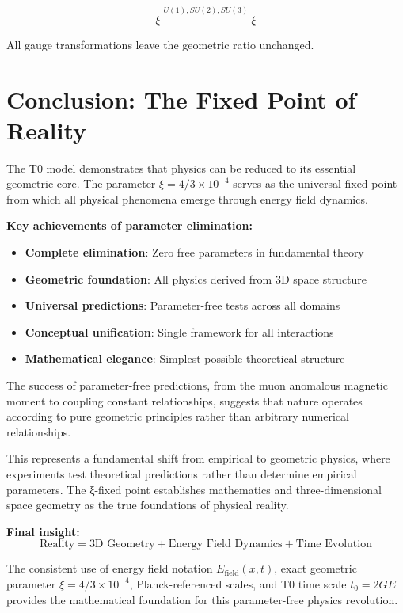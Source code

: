 \documentclass[12pt,a4paper]{report}
\begin{document}
\begin{equation}
	\xi \xrightarrow{U(1), SU(2), SU(3)} \xi
\end{equation}

All gauge transformations leave the geometric ratio unchanged.

\section{Conclusion: The Fixed Point of Reality}
\label{sec:conclusion_fixed_point}

The T0 model demonstrates that physics can be reduced to its essential geometric core. The parameter $\xi = 4/3 \times 10^{-4}$ serves as the universal fixed point from which all physical phenomena emerge through energy field dynamics.

\textbf{Key achievements of parameter elimination:}

\begin{itemize}
	\item \textbf{Complete elimination}: Zero free parameters in fundamental theory
	\item \textbf{Geometric foundation}: All physics derived from 3D space structure
	\item \textbf{Universal predictions}: Parameter-free tests across all domains
	\item \textbf{Conceptual unification}: Single framework for all interactions
	\item \textbf{Mathematical elegance}: Simplest possible theoretical structure
\end{itemize}

The success of parameter-free predictions, from the muon anomalous magnetic moment to coupling constant relationships, suggests that nature operates according to pure geometric principles rather than arbitrary numerical relationships.

This represents a fundamental shift from empirical to geometric physics, where experiments test theoretical predictions rather than determine empirical parameters. The ξ-fixed point establishes mathematics and three-dimensional space geometry as the true foundations of physical reality.

\textbf{Final insight:}
\begin{equation}
	\text{Reality} = \text{3D Geometry} + \text{Energy Field Dynamics} + \text{Time Evolution}
\end{equation}

The consistent use of energy field notation $E_{\text{field}}(x,t)$, exact geometric parameter $\xi = 4/3 \times 10^{-4}$, Planck-referenced scales, and T0 time scale $t_0 = 2GE$ provides the mathematical foundation for this parameter-free physics revolution.
\end{document}
